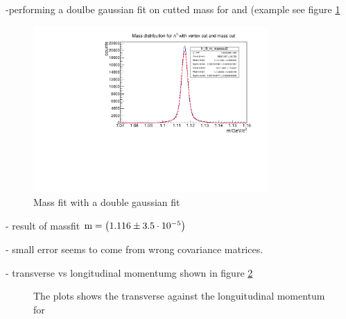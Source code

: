 		-performing a doulbe gaussian fit on cutted mass for \lam and \alam (example see figure \ref{fig:lambda0_massfit}
		
		\begin{figure}
			\centering
				\includegraphics[width=0.8\textwidth]{./plots/lambda0/lambda0_m_masscut2.pdf}
			\caption{Mass fit with a double gaussian fit}
			\label{fig:lambda0_massfit}
		\end{figure}
		
		- result of massfit $\textnormal{m} = \left(1.116 \pm 3.5\cdot 10^{-5}\right)$ \massunit
		
		- small error seems to come from wrong covariance matrices.
		
		- transverse vs longitudinal momentumg shown in figure \ref{fig:lambda0_pt_vs_pz}
		
		\begin{figure}
			
			\caption{The plots shows the transverse against the longuitudinal momentum for \lam}
			\label{fig:lambda0_pt_vs_pz}
		
		\end{figure}
		

